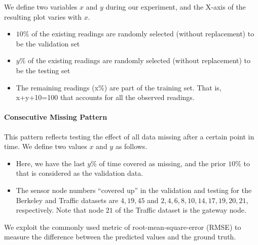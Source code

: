 We define two variables $x$ and $y$ during our experiment, and the X-axis of the resulting plot varies with $x$.
\begin{itemize}
\item $10\%$ of the existing readings are randomly selected (without replacement) to be the validation set
\item $y\%$ of the existing readings are randomly selected (without replacement) to be the testing set
\item The remaining readings (x\%) are part of the training set. That is, x+y+10=100 that accounts for all the observed readings.
\end{itemize}

\paragraph*{Consecutive Missing Pattern}
This pattern reflects testing the effect of all data missing after a certain point in time.
We define two values $x$ and $y$ as follows.
\begin{itemize}
\item Here, we have the last $y\%$ of time covered as missing, and the prior $10\%$ to that is considered as the validation data.
\item The sensor node numbers ``covered up'' in the validation and testing for the Berkeley and Traffic datasets are ${4,19,45}$ and ${2,4,6,8,10,14,17,19,20,21}$, respectively.
Note that node $21$ of the Traffic dataset is the gateway node.
\end{itemize}

We exploit the commonly used metric of root-mean-square-error (RMSE) to measure the difference between the predicted values and the ground truth.
